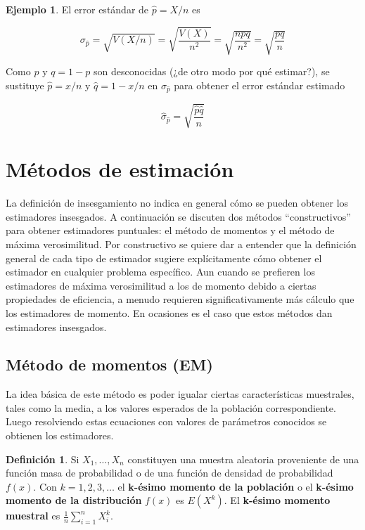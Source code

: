 \documentclass[
  11pt,
]{book}
\theoremstyle{definition}
\newtheorem{definition}{Definición}[chapter]
\theoremstyle{definition}
\newtheorem{example}{Ejemplo}[chapter]
\theoremstyle{definition}
\theoremstyle{definition}
\theoremstyle{remark}
\begin{document}
\begin{example}
El error estándar de \(\widehat{p} = X/n\) es

\[
\sigma_{\widehat{p}} = \sqrt{V(X/n)} = \sqrt{\frac{V(X)}{n^2}} = \sqrt{\frac{npq}{n^2}} = \sqrt{\frac{pq}{n}}
\]

Como \(p\) y \(q = 1 - p\) son desconocidas (¿de otro modo por qué estimar?), se sustituye \(\widehat{p} = x/n\) y \(\hat{q} = 1 - x/n\) en \(\sigma_{\widehat{p}}\) para obtener el error estándar estimado

\[
\widehat{\sigma}_{\hat{p}} = \sqrt{\frac{\hat{p}\hat{q}}{n}} 
\]
\end{example}

\section{Métodos de estimación}\label{muxe9todos-de-estimaciuxf3n}

La definición de insesgamiento no indica en general cómo se pueden obtener los estimadores insesgados. A continuación se discuten dos métodos ``constructivos'' para obtener estimadores puntuales: el método de momentos y el método de máxima verosimilitud. Por constructivo se quiere dar a entender que la definición general de cada tipo de estimador sugiere explícitamente cómo obtener el estimador en cualquier problema específico. Aun cuando se prefieren los estimadores de máxima verosimilitud a los de momento debido a ciertas propiedades de eficiencia, a menudo requieren significativamente más cálculo que los estimadores de momento. En ocasiones es el caso que estos métodos dan estimadores insesgados.

\subsection{Método de momentos (EM)}\label{muxe9todo-de-momentos-em}

La idea básica de este método es poder igualar ciertas características muestrales, tales como la media, a los valores esperados de la población correspondiente. Luego resolviendo estas ecuaciones con valores de parámetros conocidos se obtienen los estimadores.

\begin{definition}
Si \(X_1, \ldots, X_n\) constituyen una muestra aleatoria proveniente de una función masa de probabilidad o de una función de densidad de probabilidad \(f(x)\). Con \(k = 1, 2, 3, \ldots\) el \textbf{k-ésimo momento de la población} o el \textbf{k-ésimo momento de la distribución} \(f(x)\) es \(E(X^k)\). El \textbf{k-ésimo momento muestral} es \(\frac{1}{n} \sum_{i=1}^n X_i^k\).
\end{definition}
\end{document}
